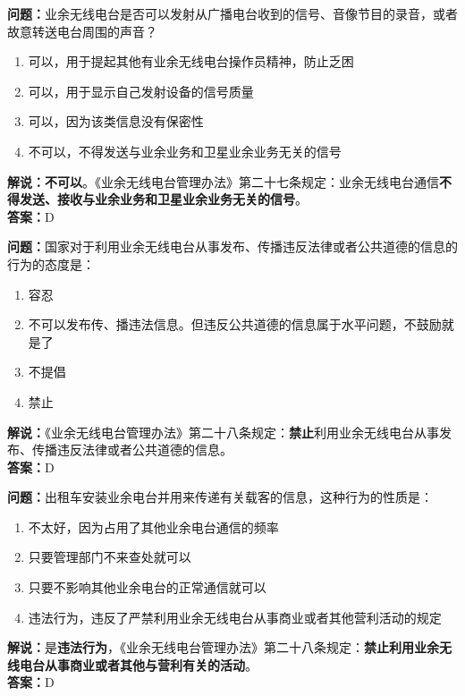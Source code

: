 \documentclass{ctexbook}
\begin{document}
\bigskip


\noindent\textbf{问题：}业余无线电台是否可以发射从广播电台收到的信号、音像节目的录音，或者故意转送电台周围的声音？
\begin{enumerate}[label=\Alph*), leftmargin=3em]
	\item 可以，用于提起其他有业余无线电台操作员精神，防止乏困
	\item 可以，用于显示自己发射设备的信号质量
	\item 可以，因为该类信息没有保密性
	\item 不可以，不得发送与业余业务和卫星业余业务无关的信号
\end{enumerate}
\textbf{解说：不可以}。《业余无线电台管理办法》第二十七条规定：业余无线电台通信\textbf{不得发送、接收与业余业务和卫星业余业务无关的信号}。\\\noindent\textbf{答案：}D



\bigskip


\noindent\textbf{问题：}国家对于利用业余无线电台从事发布、传播违反法律或者公共道德的信息的行为的态度是：
\begin{enumerate}[label=\Alph*), leftmargin=3em]
	\item 容忍
	\item 不可以发布传、播违法信息。但违反公共道德的信息属于水平问题，不鼓励就是了
	\item 不提倡
	\item 禁止
\end{enumerate}
\noindent\textbf{解说：}《业余无线电台管理办法》第二十八条规定：\textbf{禁止}利用业余无线电台从事发布、传播违反法律或者公共道德的信息。\\\noindent\textbf{答案：}D



\bigskip


\noindent\textbf{问题：}出租车安装业余电台并用来传递有关载客的信息，这种行为的性质是：
\begin{enumerate}[label=\Alph*), leftmargin=3em]
	\item 不太好，因为占用了其他业余电台通信的频率
	\item 只要管理部门不来查处就可以
	\item 只要不影响其他业余电台的正常通信就可以
	\item 违法行为，违反了严禁利用业余无线电台从事商业或者其他营利活动的规定%
\end{enumerate}
\noindent\textbf{解说：}是\textbf{违法行为}，《业余无线电台管理办法》第二十八条规定：\textbf{禁止利用业余无线电台从事商业或者其他与营利有关的活动}。\\\noindent\textbf{答案：}D
\end{document}

